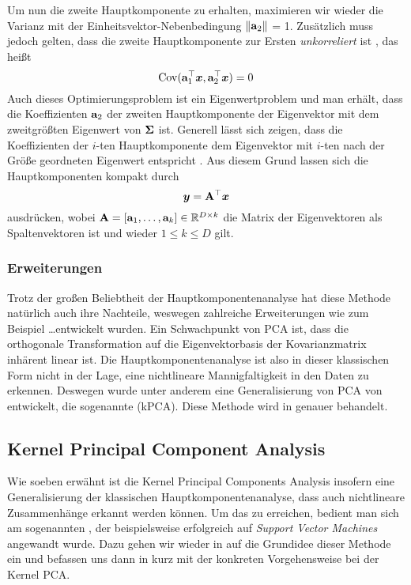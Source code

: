 Um nun die zweite Hauptkomponente zu erhalten, maximieren wir wieder die Varianz mit der
Einheitsvektor-Nebenbedingung $\left\lVert\mathbf{a}_2\right\rVert$ = 1. Zusätzlich muss jedoch gelten, dass die
zweite Hauptkomponente zur Ersten \textit{unkorreliert} ist \parencite[5]{Jolliffe.2002}, das heißt
\begin{equation}
	\operatorname{Cov}(\mathbf{a}_1^\top\bm{x}, \mathbf{a}_2^\top\bm{x}) = 0
\end{equation}
Auch dieses Optimierungsproblem ist ein Eigenwertproblem und man erhält, dass die Koeffizienten $\mathbf{a}_2$ der zweiten Hauptkomponente der Eigenvektor mit dem zweitgrößten Eigenwert von $\mathbf{\Sigma}$ ist.
Generell lässt sich zeigen, dass die Koeffizienten der $i$-ten Hauptkomponente dem Eigenvektor mit $i$-ten nach der Größe geordneten Eigenwert entspricht \parencite[6]{Jolliffe.2002}. Aus diesem Grund lassen sich die Hauptkomponenten kompakt durch
\begin{equation}
	\bm{y} = \mathbf{A}^\top \bm{x}
\end{equation}
ausdrücken, wobei $\mathbf{A} = [\mathbf{a}_1,\ldots,\mathbf{a}_k] \in \mathbb{R}^{D \times k}$ die Matrix der Eigenvektoren als Spaltenvektoren ist und wieder $1 \leq k \leq D$ gilt.

\subsubsection{Erweiterungen}
\label{ch:MethodenDerDimRed:traditionell:PCA:Erweiterungen}
Trotz der großen Beliebtheit der Hauptkomponentenanalyse hat diese Methode natürlich auch ihre Nachteile, weswegen zahlreiche Erweiterungen wie zum Beispiel \ldots\addref entwickelt wurden.
Ein Schwachpunkt von PCA ist, dass die orthogonale Transformation auf die Eigenvektorbasis der Kovarianzmatrix inhärent linear ist. Die Hauptkomponentenanalyse ist also in dieser klassischen Form nicht in der Lage, eine nichtlineare Mannigfaltigkeit in den Daten zu erkennen. Deswegen wurde unter anderem eine Generalisierung von PCA von \textcite{Scholkopf.1997} entwickelt, die sogenannte  (kPCA). Diese Methode wird in  genauer behandelt.

\subsection{Kernel Principal Component Analysis}
\label{ch:MethodenDerDimRed:traditionell:kPCA}
Wie soeben erwähnt ist die Kernel Principal Components Analysis insofern eine Generalisierung der klassischen Hauptkomponentenanalyse, dass auch nichtlineare Zusammenhänge erkannt werden können.
Um das zu erreichen, bedient man sich am sogenannten , der beispielsweise erfolgreich auf \textit{Support Vector Machines} \parencite{Boser.1992} angewandt wurde. Dazu gehen wir wieder in
 auf die Grundidee dieser Methode ein
und befassen uns dann in 
kurz mit der konkreten Vorgehensweise bei der Kernel PCA.

